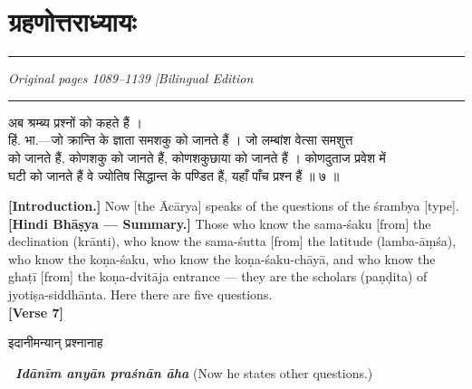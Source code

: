 \documentclass[11pt,a4paper]{article}
\newcommand{\dev}[1]{{\devanagarifont #1}}
\newcommand{\bilingualpair}[2]{%
  \noindent%
  \begin{minipage}[t]{0.48\textwidth}
    #1%
  \end{minipage}%
  \hfill%
  \begin{minipage}[t]{0.48\textwidth}
    #2%
  \end{minipage}%
  \par\vspace{0.5em}%
}
\newenvironment{sanskritcol}{\devanagarifont\small}{}
\newenvironment{englishcol}{\iastfont\small}{}
\begin{document}
\newpage

\section*{\dev{ग्रहणोत्तराध्यायः}}

\noindent\rule{\textwidth}{0.6pt}
\begin{center}
\textit{Original pages 1089--1139 \quad|\quad Bilingual Edition}
\end{center}
\noindent\rule{\textwidth}{0.6pt}
\vspace{0.5cm}

\bilingualpair{%
\begin{sanskritcol}
\dev{अब श्रम्ब्य प्रश्नों को कहते हैं ।}\\[0.3em]
\dev{हिं. भा.---जो क्रान्ति के ज्ञाता समशकु को जानते हैं । जो लम्बांश वेत्सा समशुत्त}\\[0.3em]
\dev{को जानते हैं, कोणशकु को जानते हैं, कोणशकुछाया को जानते हैं । कोणदुताज प्रवेश में}\\[0.3em]
\dev{घटी को जानते हैं वे ज्योतिष सिद्धान्त के पण्डित हैं, यहाँ पाँच प्रश्न हैं ॥ ७ ॥}
\end{sanskritcol}%
}{%
\begin{englishcol}
\textbf{[Introduction.]} Now [the Ācārya] speaks of the questions of the \'srambya [type].\\[0.3em]
\textbf{[Hindi Bhāṣya --- Summary.]} Those who know the sama-\'saku [from] the declination (krānti), who know the sama-\'sutta [from] the latitude (lamba-\=aṃśa), who know the koṇa-\'saku, who know the koṇa-\'saku-chāyā, and who know the ghaṭī [from] the koṇa-dvitāja entrance --- they are the scholars (paṇḍita) of jyotiṣa-\-siddhānta. Here there are five questions.\\[0.3em]
\hfill \textbf{[Verse 7]}
\end{englishcol}%
}

\vspace{0.5cm}
\bilingualpair{%
\begin{sanskritcol}
\dev{इदानीमन्यान् प्रश्नानाह}
\end{sanskritcol}%
}{%
\begin{englishcol}
\textbf{\textbar\ \textit{Idānīm anyān praśnān āha}} (Now he states other questions.)
\end{englishcol}%
}
\end{document}
